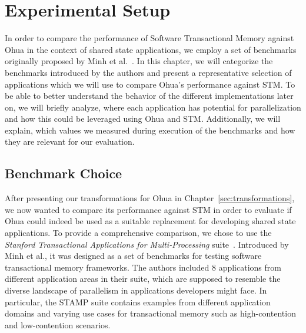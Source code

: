 %
\chapter{Experimental Setup}%
\label{sec:experiments}

In order to compare the performance of Software Transactional Memory against Ohua in the context of shared state applications, we employ a set of benchmarks originally proposed by Minh et al.~\cite{minh2008stamp}.
In this chapter, we will categorize the benchmarks introduced by the authors and present a representative selection of applications which we will use to compare Ohua's performance against STM.
To be able to better understand the behavior of the different implementations later on, we will briefly analyze, where each application has potential for parallelization and how this could be leveraged using Ohua and STM.
Additionally, we will explain, which values we measured during execution of the benchmarks and how they are relevant for our evaluation.

\section{Benchmark Choice}
\label{sec:experiments:choice}

After presenting our transformations for Ohua in Chapter~\ref{sec:transformations}, we now wanted to compare its performance against STM in order to evaluate if Ohua could indeed be used as a suitable replacement for developing shared state applications.
To provide a comprehensive comparison, we chose to use the \emph{Stanford Transactional Applications for Multi-Processing} suite~\cite{minh2008stamp}.
Introduced by Minh et al., it was designed as a set of benchmarks for testing software transactional memory frameworks.
The authors included 8 applications from different application areas in their suite, which are supposed to resemble the diverse landscape of parallelism in applications developers might face.
In particular, the STAMP suite contains examples from different application domains and varying use cases for transactional memory such as high-contention and low-contention scenarios.

